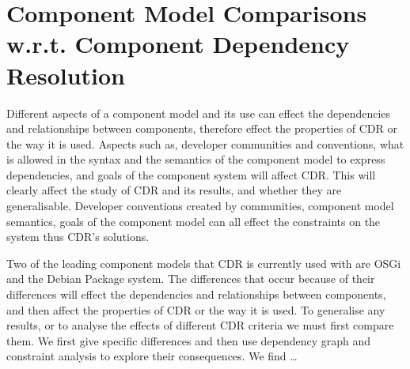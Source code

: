 \chapter{Component Model Comparisons w.r.t. Component Dependency Resolution}
\label{comparison}
{}Different aspects of a component model and its use can effect the dependencies and relationships between components,
{}therefore effect the properties of CDR or the way it is used.
{}Aspects such as, developer communities and conventions, what is allowed in the syntax and the semantics of the component model to express dependencies,
{}and goals of the component system will affect CDR.
{}This will clearly affect the study of CDR and its results, and whether they are generalisable.
{}Developer conventions created by communities, component model semantics, goals of the component model can all effect the constraints on the system thus CDR's solutions.





Two of the leading component models that CDR is currently used with are OSGi and the Debian Package system.
The differences that occur because of their differences will effect the dependencies and relationships between components,
and then affect the properties of CDR or the way it is used.
To generalise any results, or to analyse the effects of different CDR criteria we must first compare them.
We first give specific differences and then use dependency graph and constraint analysis to explore their consequences.
We find \ldots%

